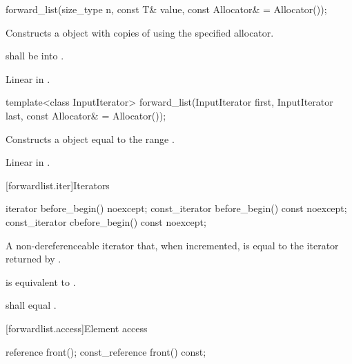 %
\begin{itemdecl}
forward_list(size_type n, const T& value, const Allocator& = Allocator());
\end{itemdecl}

\begin{itemdescr}
\pnum
\effects Constructs a  object with  copies of  using the specified allocator.

\pnum
\requires {} shall be  into .

\pnum
\complexity Linear in .
\end{itemdescr}

%
\begin{itemdecl}
template<class InputIterator>
  forward_list(InputIterator first, InputIterator last, const Allocator& = Allocator());
\end{itemdecl}

\begin{itemdescr}
\pnum
\effects Constructs a  object equal to the range .

\pnum
\complexity Linear in .
\end{itemdescr}

[forwardlist.iter]{Iterators}

%
%
\begin{itemdecl}
iterator before_begin() noexcept;
const_iterator before_begin() const noexcept;
const_iterator cbefore_begin() const noexcept;
\end{itemdecl}

\begin{itemdescr}
\pnum
\returns A non-dereferenceable iterator that, when incremented, is equal to the iterator
returned by .

\pnum
\effects {} is equivalent to
.

\pnum
\remarks {} shall equal .
\end{itemdescr}

[forwardlist.access]{Element access}

%
\begin{itemdecl}
reference front();
const_reference front() const;
\end{itemdecl}

